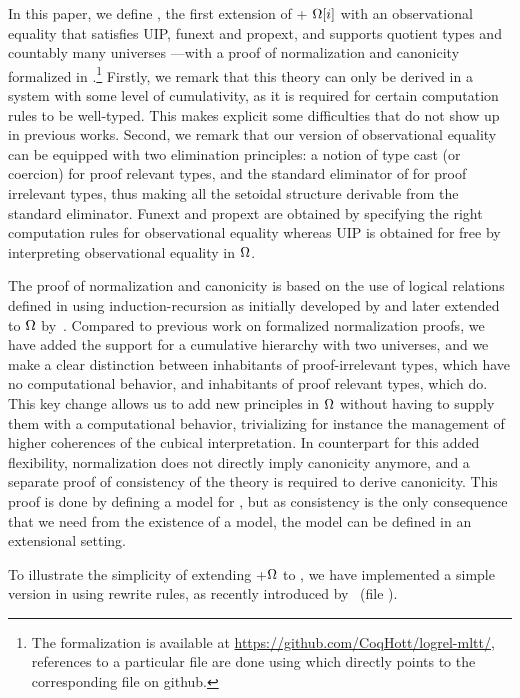 In this paper, we define \SetoidTT, the first extension of \MLTT +
$\Omega[i]$ with an observational equality that satisfies UIP, funext
and propext, and supports quotient types and countably many universes
---with a proof of normalization and canonicity formalized in \Agda.\footnote{The formalization is available at
  \url{https://github.com/CoqHott/logrel-mltt/}, references to a
  particular file are done using  which
  directly points to the corresponding file on github.}
%
Firstly, we remark that this theory can only be derived in a system with
some level of cumulativity, as it is required for certain
computation rules to be well-typed. This makes explicit some difficulties
that do not show up in previous works.
%
Second, we remark that our version of observational equality can be equipped
with two elimination principles: a notion of type cast (or coercion) for
proof relevant types, and the standard eliminator of \MLTT for
proof irrelevant types, thus making all the setoidal structure
derivable from the standard eliminator.
%
Funext and propext are obtained by specifying the right
computation rules for observational equality whereas UIP is obtained
for free by interpreting observational equality in $\Omega$.

The proof of normalization and canonicity is based on the use
of logical relations defined in \Agda using induction-recursion as
initially developed by  and later extended to
$\Omega$ by~.
%
Compared to previous work on formalized normalization proofs, we have added the support
for a cumulative hierarchy with two universes, and we make a clear distinction
between inhabitants of proof-irrelevant types, which have no computational
behavior, and inhabitants of proof relevant types, which do.
%
This key change allows us to add new principles in $\Omega$ without
having to supply them with a computational behavior, trivializing for
instance the management of higher coherences of the cubical interpretation.
%
In counterpart for this added flexibility, normalization does not directly
imply canonicity anymore, and a separate proof of consistency of the
theory is required to derive canonicity.
%
This proof is done by defining a model for \SetoidTT, but as
consistency is the only consequence that we need from the existence of
a model, the model can be defined in an extensional setting.

To illustrate the simplicity of extending \MLTT+$\Omega$ to \SetoidTT,
we have implemented a simple version in
\Agda using rewrite rules, as recently introduced
by~ (file ).

